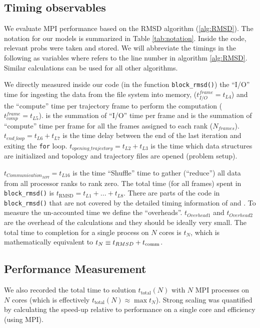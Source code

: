 \label{methods}

\subsection{Timing observables}
We evaluate MPI performance based on the RMSD algorithm (\ref{alg:RMSD}). 
The notation for our models is summarized in Table \ref{tab:notation}.
Inside the code, relevant probs were taken and stored. 
We will abbreviate the timings in the following as variables  where  refers to the line number in algorithm \ref{alg:RMSD}.
Similar calculations can be used for all other algorithms.

We directly measured inside our code (in the function \texttt{block\_rmsd()}) the ``I/O'' time for
ingesting the data from the file system into memory, ($t_{I/O}^{frame} = t_{L4}$) and the ``compute'' time per
trajectory frame to perform the computation ($t_{comp}^{frame} = t_{L5}$). 
 \tIO is the summation of ``I/O'' time per frame and \tcomp is the summation of ``compute'' time per frame for all the frames assigned to each rank ($N_{frames}$). 
$t_{end\_loop} = t_{L6}+t_{L7}$ is the time delay between the end of the last iteration and exiting the \texttt{for} loop.
$t_{opening\_trajectory} = t_{L2}+t_{L3}$ is the time which data structures are initialized and topology and trajectory files are opened (problem setup).

$t_{Communication_{MPI}} = t_{L16}$ is the time ``Shuffle'' time to gather (``reduce'') all data from all processor ranks to rank zero.
The total time (for all frames) spent in \texttt{block\_rmsd()} is $t_{\text{RMSD}} = t_{L1} + ...+ t_{L8}$. 
There are parts of the code in \texttt{block\_rmsd()} that are not covered by the detailed timing information of \tcomp and \tIO. 
To measure the un-accounted time we define the ``overheads''.
$t_{Overhead1}$ and $t_{Overhead2}$ are the overhead of the calculations and they should be ideally very small.  
The total time to completion for a single process on $N$ cores is $t_{N}$, which is mathematically equivalent to
$t_{N} \equiv t_{RMSD} + t_{\text{comm}}$.

\subsection{Performance Measurement}
We also recorded the total time to solution $t_{\text{total}}(N)$ with $N$ MPI processes on $N$ cores (which is effectively
$t_{\text{total}}(N) \approx \max t_{N}$). 
Strong scaling was quantified by calculating the speed-up relative to performance on a single core  and efficiency  (using MPI).

